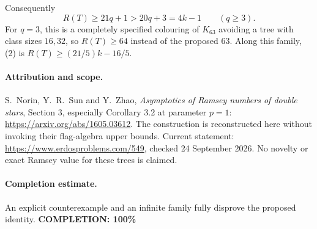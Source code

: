 Consequently
\[
 R(T)\geq21q+1>20q+3=4k-1\qquad(q\geq3). \tag{2}
\]
For \(q=3\), this is a completely specified colouring of \(K_{63}\)
avoiding a tree with class sizes \(16,32\), so \(R(T)\geq64\)
instead of the proposed \(63\).
Along this family, (2) is
\(R(T)\geq(21/5)k-16/5\).

\paragraph{Attribution and scope.}
S.~Norin, Y.~R.~Sun and Y.~Zhao, \emph{Asymptotics of Ramsey numbers
of double stars}, Section 3, especially Corollary 3.2 at parameter
\(p=1\): \url{https://arxiv.org/abs/1605.03612}.
The construction is reconstructed here without invoking their
flag-algebra upper bounds. Current statement:
\url{https://www.erdosproblems.com/549}, checked 24 September 2026.
No novelty or exact Ramsey value for these trees is claimed.

\paragraph{Completion estimate.}
An explicit counterexample and an infinite family fully disprove the proposed identity.
\textbf{COMPLETION: 100\%}
